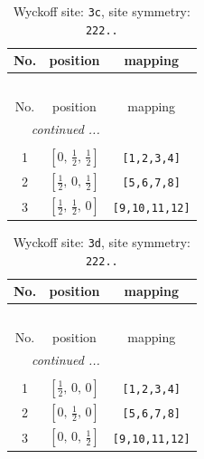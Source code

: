\documentclass[fleqn,8pt]{jsarticle}
\begin{document}
\begin{longtable}{ccc}
\caption{Wyckoff site: {\tt 3c}, site symmetry: {\tt 222..}}
 \\
 \hline \hline
No. & position & mapping \\ \hline \endfirsthead

\multicolumn{2}{l}{\tablename\ \thetable{}} \\
 \hline \hline
No. & position & mapping \\ \hline \endhead

 \hline \hline
\multicolumn{2}{r}{\footnotesize\it continued ...} \\ \endfoot

 \hline \hline
\multicolumn{2}{r}{} \\ \endlastfoot

1 & $\left[ 0,\, \frac{1}{2},\, \frac{1}{2} \right]$ & {\tt [1,2,3,4]} \\ \hline
2 & $\left[ \frac{1}{2},\, 0,\, \frac{1}{2} \right]$ & {\tt [5,6,7,8]} \\ \hline
3 & $\left[ \frac{1}{2},\, \frac{1}{2},\, 0 \right]$ & {\tt [9,10,11,12]} \\
\end{longtable}
\renewcommand{\arraystretch}{1.2}
\begin{longtable}{ccc}
\caption{Wyckoff site: {\tt 3d}, site symmetry: {\tt 222..}}
 \\
 \hline \hline
No. & position & mapping \\ \hline \endfirsthead

\multicolumn{2}{l}{\tablename\ \thetable{}} \\
 \hline \hline
No. & position & mapping \\ \hline \endhead

 \hline \hline
\multicolumn{2}{r}{\footnotesize\it continued ...} \\ \endfoot

 \hline \hline
\multicolumn{2}{r}{} \\ \endlastfoot

1 & $\left[ \frac{1}{2},\, 0,\, 0 \right]$ & {\tt [1,2,3,4]} \\ \hline
2 & $\left[ 0,\, \frac{1}{2},\, 0 \right]$ & {\tt [5,6,7,8]} \\ \hline
3 & $\left[ 0,\, 0,\, \frac{1}{2} \right]$ & {\tt [9,10,11,12]} \\
\end{longtable}
\renewcommand{\arraystretch}{1.2}
\end{document}
